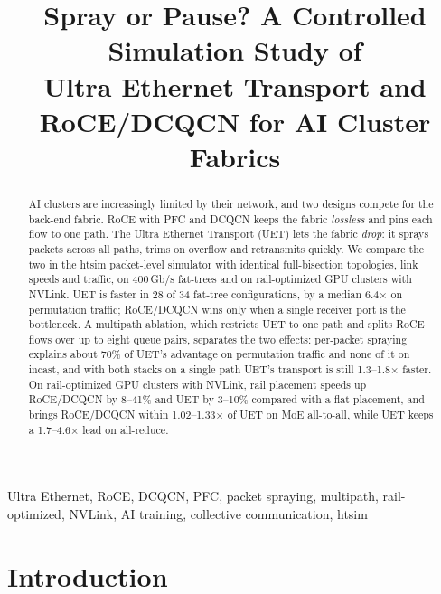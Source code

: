 \documentclass[conference]{IEEEtran}
\begin{document}
\title{Spray or Pause? A Controlled Simulation Study of\\
Ultra Ethernet Transport and RoCE/DCQCN for AI Cluster Fabrics}

\author{}

\maketitle

\begin{abstract}
AI clusters are increasingly limited by their network, and two designs compete
for the back-end fabric. RoCE with PFC and DCQCN keeps the fabric
\emph{lossless} and pins each flow to one path. The Ultra Ethernet Transport
(UET) lets the fabric \emph{drop}: it sprays packets across all paths, trims
on overflow and retransmits quickly. We compare the two in the htsim
packet-level simulator with identical full-bisection topologies, link speeds
and traffic, on 400\,Gb/s fat-trees and on rail-optimized GPU clusters with
NVLink. UET is faster in 28 of 34 fat-tree configurations, by a median
6.4$\times$ on permutation traffic; RoCE/DCQCN wins only when a single
receiver port is the bottleneck. A multipath ablation, which restricts UET to
one path and splits RoCE flows over up to eight queue pairs, separates the
two effects: per-packet spraying explains about 70\% of UET's advantage on
permutation traffic and none of it on incast, and with both stacks on a
single path UET's transport is still 1.3--1.8$\times$ faster. On
rail-optimized GPU clusters with NVLink, rail placement speeds up RoCE/DCQCN by
8--41\% and UET by 3--10\% compared with a flat placement, and brings
RoCE/DCQCN within 1.02--1.33$\times$ of UET on MoE all-to-all, while UET keeps
a 1.7--4.6$\times$ lead on all-reduce.
\end{abstract}

\begin{IEEEkeywords}
Ultra Ethernet, RoCE, DCQCN, PFC, packet spraying, multipath, rail-optimized,
NVLink, AI training, collective communication, htsim
\end{IEEEkeywords}

\section{Introduction}
\end{document}
